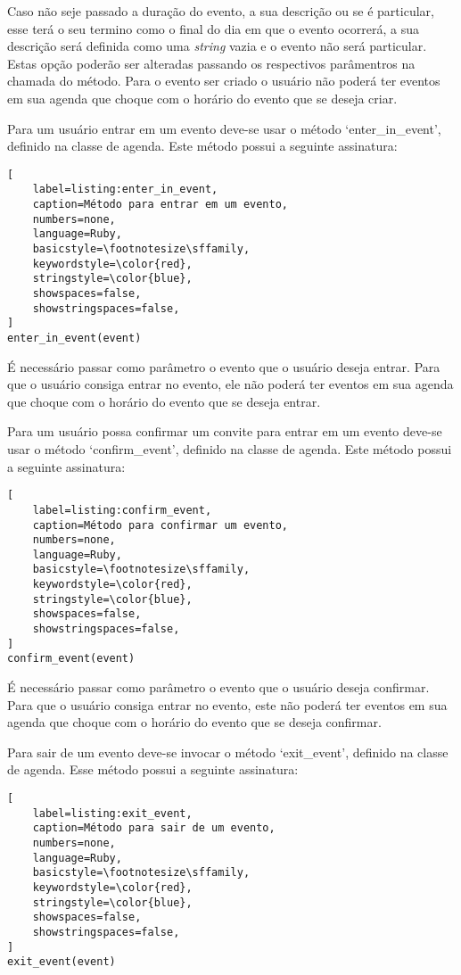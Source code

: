Caso não seje passado a duração do evento, a sua descrição ou se é particular, esse terá o seu termino como o final do dia em que o evento ocorrerá, a sua descrição será definida como uma \textit{string} vazia e o evento não será particular. Estas opção poderão ser alteradas passando os respectivos parâmentros na chamada do método. Para o evento ser criado o usuário não poderá ter eventos em sua agenda que choque com o horário do evento que se deseja criar.

Para um usuário entrar em um evento deve-se usar o método `enter\_in\_event', definido na classe de agenda. Este método possui a seguinte assinatura:

\begin{lstlisting}[
    label=listing:enter_in_event,
    caption=Método para entrar em um evento,
    numbers=none,
    language=Ruby,
    basicstyle=\footnotesize\sffamily,
    keywordstyle=\color{red},
    stringstyle=\color{blue},
    showspaces=false,
    showstringspaces=false,
]
enter_in_event(event)
\end{lstlisting}

É necessário passar como parâmetro o evento que o usuário deseja entrar. Para que o usuário consiga entrar no evento, ele não poderá ter eventos em sua agenda que choque com o horário do evento que se deseja entrar.

Para um usuário possa confirmar um convite para entrar em um evento deve-se usar o método `confirm\_event', definido na classe de agenda. Este método possui a seguinte assinatura:

\begin{lstlisting}[
    label=listing:confirm_event,
    caption=Método para confirmar um evento,
    numbers=none,
    language=Ruby,
    basicstyle=\footnotesize\sffamily,
    keywordstyle=\color{red},
    stringstyle=\color{blue},
    showspaces=false,
    showstringspaces=false,
]
confirm_event(event)
\end{lstlisting}

É necessário passar como parâmetro o evento que o usuário deseja confirmar. Para que o usuário consiga entrar no evento, este não poderá ter eventos em sua agenda que choque com o horário do evento que se deseja confirmar.

Para sair de um evento deve-se invocar o método `exit\_event', definido na classe de agenda. Esse método possui a seguinte assinatura:

\begin{lstlisting}[
    label=listing:exit_event,
    caption=Método para sair de um evento,
    numbers=none,
    language=Ruby,
    basicstyle=\footnotesize\sffamily,
    keywordstyle=\color{red},
    stringstyle=\color{blue},
    showspaces=false,
    showstringspaces=false,
]
exit_event(event)
\end{lstlisting}

